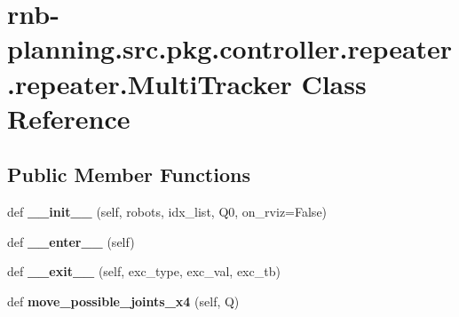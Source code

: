 \hypertarget{classrnb-planning_1_1src_1_1pkg_1_1controller_1_1repeater_1_1repeater_1_1_multi_tracker}{}\section{rnb-\/planning.src.\+pkg.\+controller.\+repeater.\+repeater.\+Multi\+Tracker Class Reference}
\label{classrnb-planning_1_1src_1_1pkg_1_1controller_1_1repeater_1_1repeater_1_1_multi_tracker}
\subsection*{Public Member Functions}
\begin{DoxyCompactItemize}
\item 
\mbox{\label{classrnb-planning_1_1src_1_1pkg_1_1controller_1_1repeater_1_1repeater_1_1_multi_tracker_abf11f46079a370c325836be24a7fb83d}} 
def {\bfseries \+\_\+\+\_\+init\+\_\+\+\_\+} (self, robots, idx\+\_\+list, Q0, on\+\_\+rviz=False)
\item 
\mbox{\label{classrnb-planning_1_1src_1_1pkg_1_1controller_1_1repeater_1_1repeater_1_1_multi_tracker_a5b663b93ed39373a251efc1556ad018c}} 
def {\bfseries \+\_\+\+\_\+enter\+\_\+\+\_\+} (self)
\item 
\mbox{\label{classrnb-planning_1_1src_1_1pkg_1_1controller_1_1repeater_1_1repeater_1_1_multi_tracker_a3028df2af73211b8d22fe45567d66219}} 
def {\bfseries \+\_\+\+\_\+exit\+\_\+\+\_\+} (self, exc\+\_\+type, exc\+\_\+val, exc\+\_\+tb)
\item 
\mbox{\label{classrnb-planning_1_1src_1_1pkg_1_1controller_1_1repeater_1_1repeater_1_1_multi_tracker_a0946cf0018811cdcb113ddaef8a08ff8}} 
def {\bfseries move\+\_\+possible\+\_\+joints\+\_\+x4} (self, Q)
\end{DoxyCompactItemize}
